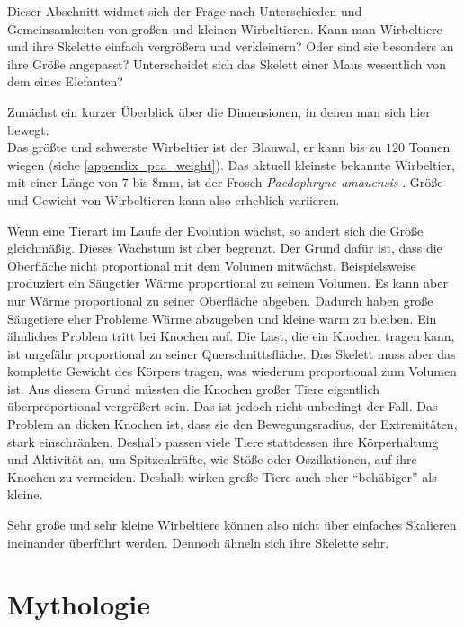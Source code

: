 Dieser Abschnitt widmet sich der Frage nach Unterschieden und Gemeinsamkeiten von großen und kleinen Wirbeltieren. Kann man Wirbeltiere und ihre Skelette einfach vergrößern und verkleinern? Oder sind sie besonders an ihre Größe angepasst? Unterscheidet sich das Skelett einer Maus wesentlich von dem eines Elefanten?

Zunächst ein kurzer Überblick über die Dimensionen, in denen man sich hier bewegt:\\
Das größte und schwerste Wirbeltier ist der Blauwal, er kann bis zu $120$ Tonnen wiegen (siehe \ref{appendix_pca_weight}). Das aktuell kleinste bekannte Wirbeltier, mit einer Länge von $7$ bis $8$mm, ist der Frosch \emph{Paedophryne amauensis} \cite{smallestVertebrate}. Größe und Gewicht von Wirbeltieren kann also erheblich variieren.

Wenn eine Tierart im Laufe der Evolution wächst, so ändert sich die Größe gleichmäßig. Dieses Wachstum ist aber begrenzt. Der Grund dafür ist, dass die Oberfläche nicht proportional mit dem Volumen mitwächst. Beispielsweise produziert ein Säugetier Wärme proportional zu seinem Volumen. Es kann aber nur Wärme proportional zu seiner Oberfläche abgeben. Dadurch haben große Säugetiere eher Probleme Wärme abzugeben und kleine warm zu bleiben.
Ein ähnliches Problem tritt bei Knochen auf. Die Last, die ein Knochen tragen kann, ist ungefähr proportional zu seiner Querschnittsfläche. Das Skelett muss aber das komplette Gewicht des Körpers tragen, was wiederum proportional zum Volumen ist.
Aus diesem Grund müssten die Knochen großer Tiere eigentlich überproportional vergrößert sein. Das ist jedoch nicht unbedingt der Fall. Das Problem an dicken Knochen ist, dass sie den Bewegungsradius, \zb der Extremitäten, stark einschränken. Deshalb passen viele Tiere stattdessen ihre Körperhaltung und Aktivität an, um Spitzenkräfte, wie Stöße oder Oszillationen, auf ihre Knochen zu vermeiden. Deshalb wirken große Tiere auch eher "`behäbiger"' als kleine. \cite[Kapitel 23]{Vergleichende_Anatomie}

Sehr große und sehr kleine Wirbeltiere können also nicht über einfaches Skalieren ineinander überführt werden. Dennoch ähneln sich ihre Skelette sehr.


\section{Mythologie}
\label{biology_mythology}


